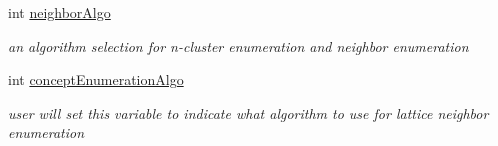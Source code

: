 \begin{DoxyCompactItemize}
int \hyperlink{class_lattice_algos_a2f00781816c66a03204d5e74010375e1}{neighborAlgo}
\begin{DoxyCompactList}\small\item\em an algorithm selection for n-\/cluster enumeration and neighbor enumeration \item\end{DoxyCompactList}\item 
int \hyperlink{class_lattice_algos_a6e7edc3f177497695e1c34b4ae6e6c79}{conceptEnumerationAlgo}
\begin{DoxyCompactList}\small\item\em user will set this variable to indicate what algorithm to use for lattice neighbor enumeration \item\end{DoxyCompactList}\end{DoxyCompactItemize}

